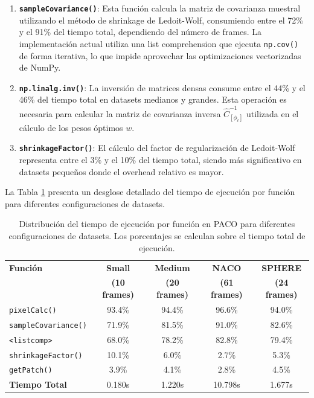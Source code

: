 \begin{enumerate}
    \item \textbf{\texttt{sampleCovariance()}}: Esta función calcula la matriz de covarianza muestral utilizando el método de shrinkage de Ledoit-Wolf, consumiendo entre el 72\% y el 91\% del tiempo total, dependiendo del número de frames. La implementación actual utiliza una list comprehension que ejecuta \texttt{np.cov()} de forma iterativa, lo que impide aprovechar las optimizaciones vectorizadas de NumPy.
    
    \item \textbf{\texttt{np.linalg.inv()}}: La inversión de matrices densas consume entre el 44\% y el 46\% del tiempo total en datasets medianos y grandes. Esta operación es necesaria para calcular la matriz de covarianza inversa $\hat{C}^{-1}_{[\phi_\ell]}$ utilizada en el cálculo de los pesos óptimos $w$.
    
    \item \textbf{\texttt{shrinkageFactor()}}: El cálculo del factor de regularización de Ledoit-Wolf representa entre el 3\% y el 10\% del tiempo total, siendo más significativo en datasets pequeños donde el overhead relativo es mayor.
\end{enumerate}

La Tabla \ref{tab:cuellos_botella_paco} presenta un desglose detallado del tiempo de ejecución por función para diferentes configuraciones de datasets.

\begin{table}[H]
    \centering
    \small
    \begin{tabular}{lcccc}
        \toprule
        \textbf{Función} & \textbf{Small} & \textbf{Medium} & \textbf{NACO} & \textbf{SPHERE} \\
        & \textbf{(10 frames)} & \textbf{(20 frames)} & \textbf{(61 frames)} & \textbf{(24 frames)} \\
        \midrule
        \texttt{pixelCalc()} & 93.4\% & 94.4\% & 96.6\% & 94.0\% \\
        \texttt{sampleCovariance()} & 71.9\% & 81.5\% & 91.0\% & 82.6\% \\
        \texttt{<listcomp>} & 68.0\% & 78.2\% & 82.8\% & 79.4\% \\
        \texttt{shrinkageFactor()} & 10.1\% & 6.0\% & 2.7\% & 5.3\% \\
        \texttt{getPatch()} & 3.9\% & 4.1\% & 2.8\% & 4.5\% \\
        \midrule
        \textbf{Tiempo Total} & 0.180s & 1.220s & 10.798s & 1.677s \\
        \bottomrule
    \end{tabular}
    \caption{Distribución del tiempo de ejecución por función en PACO para diferentes configuraciones de datasets. Los porcentajes se calculan sobre el tiempo total de ejecución.}
    \label{tab:cuellos_botella_paco}
\end{table}

